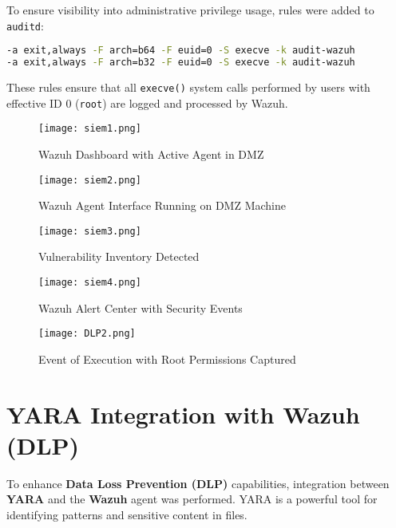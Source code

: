 \documentclass[12pt]{report}
\begin{document}
To ensure visibility into administrative privilege usage, rules were added to \texttt{auditd}:

\begin{lstlisting}[language=bash, caption={Audit Rules in /etc/audit/rules.d/audit.rules}]
-a exit,always -F arch=b64 -F euid=0 -S execve -k audit-wazuh
-a exit,always -F arch=b32 -F euid=0 -S execve -k audit-wazuh
\end{lstlisting}

These rules ensure that all \texttt{execve()} system calls performed by users with effective ID 0 (\texttt{root}) are logged and processed by Wazuh.

\begin{figure}[h]
    \centering
    \texttt{[image: siem1.png]}
    \caption{Wazuh Dashboard with Active Agent in DMZ}
    \label{fig:wazuh-dashboard}
\end{figure}

\begin{figure}[h]
    \centering
    \texttt{[image: siem2.png]}
    \caption{Wazuh Agent Interface Running on DMZ Machine}
    \label{fig:wazuh-agent-dmz}
\end{figure}

\begin{figure}[h]
    \centering
    \texttt{[image: siem3.png]}
    \caption{Vulnerability Inventory Detected}
    \label{fig:wazuh-vulnerabilities}
\end{figure}

\begin{figure}[h]
    \centering
    \texttt{[image: siem4.png]}
    \caption{Wazuh Alert Center with Security Events}
    \label{fig:wazuh-alerts}
\end{figure}

\begin{figure}[h]
    \centering
    \texttt{[image: DLP2.png]}
    \caption{Event of Execution with Root Permissions Captured}
    \label{fig:wazuh-rootexec}
\end{figure}

\clearpage

\section*{YARA Integration with Wazuh (DLP)}

To enhance \textbf{Data Loss Prevention (DLP)} capabilities, integration between \textbf{YARA} and the \textbf{Wazuh} agent was performed. YARA is a powerful tool for identifying patterns and sensitive content in files.
\end{document}
